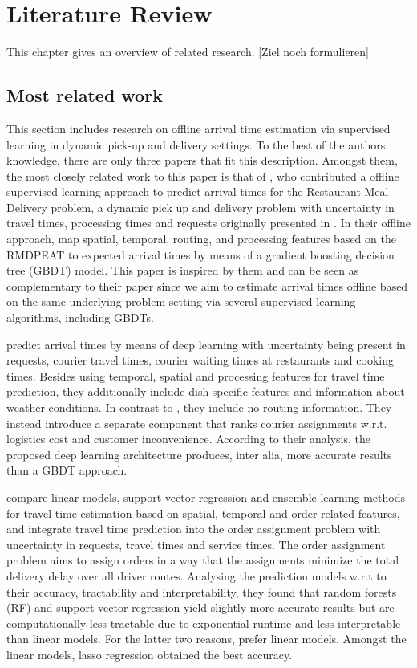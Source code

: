 \chapter{Literature Review}
\label{chap:review}
This chapter gives an overview of related research. [Ziel noch formulieren]


\section{Most related work}
This section includes research on offline arrival time estimation via supervised learning in dynamic pick-up and delivery settings.
To the best of the authors knowledge, there are only three papers that fit this description. Amongst them, the most closely related work to this paper is that of \cite{Hildebrandt2020_EAT}, who contributed a offline supervised learning approach to predict arrival times for the Restaurant Meal Delivery problem, a dynamic pick up and delivery problem with uncertainty in travel times, processing times and requests originally presented in \cite{UlmerRMDP}.
In their offline approach, \cite{Hildebrandt2020_EAT} map spatial, temporal, routing, and processing features based on the RMDPEAT to expected arrival times by means of a gradient boosting decision tree (GBDT) model. This paper is inspired by them and can be seen as complementary to their paper since we aim to estimate arrival times offline based on the same underlying problem setting via several supervised learning algorithms, including GBDTs.

\cite{Zhu2020_OFCTE_DL} predict arrival times by means of deep learning with uncertainty being present in requests, courier travel times, courier waiting times at restaurants and cooking times. Besides using temporal, spatial and processing features for travel time prediction, they additionally include dish specific features and information about weather conditions. In contrast to \cite{Hildebrandt2020_EAT}, they include no routing information. They instead introduce a separate component that ranks courier assignments w.r.t. logistics cost and customer inconvenience. According to their analysis, the proposed deep learning architecture produces, inter alia, more accurate results than a GBDT approach.

\cite{Liu2018_LM_PLM} compare linear models, support vector regression and ensemble learning methods for travel time estimation based on spatial, temporal and order-related features, and integrate travel time prediction into the order assignment problem with uncertainty in requests, travel times and service times. The order assignment problem aims to assign orders in a way that the assignments minimize the total delivery delay over all driver routes. Analysing the prediction models w.r.t to their accuracy, tractability and interpretability, they found that random forests (RF) and support vector regression yield slightly more accurate results but are computationally less tractable due to exponential runtime and less interpretable than linear models. For the latter two reasons, \cite{Liu2018_LM_PLM} prefer linear models. Amongst the linear models, lasso regression obtained the best accuracy.


